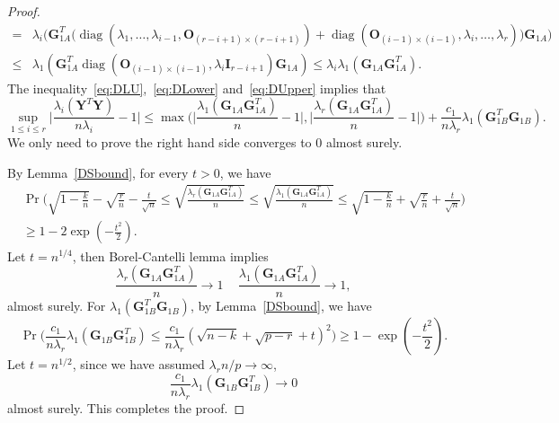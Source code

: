 \documentclass[12pt]{article} %
\DeclareMathOperator{\mydiag}{diag}
\newcommand{\bY}{\mathbf{Y}}
\newcommand{\bG}{\mathbf{G}}
\newcommand{\bO}{\mathbf{O}}
\newcommand{\bI}{\mathbf{I}}
\theoremstyle{definition}
\begin{document}
\begin{proof}
\begin{equation}
\begin{aligned}
=&\lambda_i\Big(
\bG_{1A}^T \big(
\mydiag(\lambda_1,\ldots,\lambda_{i-1},\bO_{(r-i+1)\times(r-i+1)})+
\mydiag(\bO_{(i-1)\times(i-1)},\lambda_i,\ldots,\lambda_r)
\big)
\bG_{1A}
\Big)\\
    \leq&
\lambda_1(\bG_{1A}^T \mydiag(\bO_{(i-1)\times(i-1)},\lambda_i \bI_{r-i+1}) \bG_{1A})
\leq  \lambda_i \lambda_1(\bG_{1A}\bG_{1A}^T).
\end{aligned}
\end{equation}
    The inequality~\eqref{eq:DLU},~\eqref{eq:DLower} and~\eqref{eq:DUpper} implies that
    $$
   \sup_{1\leq i \leq r} \Big|\frac{\lambda_i(\bY^T \bY)}{n\lambda_i}-1\Big|\leq
    \max\Big(\Big|\frac{\lambda_1(\bG_{1A}\bG_{1A}^T)}{n}-1\Big|,\Big|\frac{\lambda_r(\bG_{1A}\bG_{1A}^T)}{n}-1\Big|\Big)+\frac{c_1}{n\lambda_r}\lambda_1(\bG_{1B}^T \bG_{1B}).
    $$
    We only need to prove the right hand side converges to $0$ almost surely.

    By Lemma~\ref{DSbound}, for every $t>0$, we have
    $$
    \begin{aligned}
        &\Pr\Big(\sqrt{1-\frac{k}{n}}-\sqrt{\frac{r}{n}}-\frac{t}{\sqrt{n}}\leq \sqrt{\frac{\lambda_r(\bG_{1A}\bG_{1A}^T)}{n}}\leq \sqrt{\frac{\lambda_1(\bG_{1A}\bG_{1A}^T)}{n}}\leq \sqrt{1-\frac{k}{n}}+\sqrt{\frac{r}{n}}+\frac{t}{\sqrt{n}} \Big) \\
        &\geq 1-2\exp(-\frac{t^2}{2}).
    \end{aligned}
    $$
    Let $t=n^{1/4}$, then Borel-Cantelli lemma implies 
    $$
    \frac{\lambda_r(\bG_{1A}\bG_{1A}^T)}{n}\to 1\,\quad
    \frac{\lambda_1(\bG_{1A}\bG_{1A}^T)}{n}\to 1,
    $$
    almost surely.
    For $\lambda_1(\bG_{1B}^T \bG_{1B})$, by Lemma~\ref{DSbound}, we have
    $$
   \Pr\Big( \frac{c_1}{n\lambda_r}{\lambda_1(\bG_{1B}\bG_{1B}^T)}\leq \frac{c_1}{n\lambda_r}(\sqrt{n-k}+\sqrt{p-r}+t)^2 \Big) 
   \geq 1-\exp(-\frac{t^2}{2}).
    $$
Let $t=n^{1/2}$, since we have assumed $\lambda_r n/p\to \infty$, $$\frac{c_1}{n\lambda_r}{\lambda_1(\bG_{1B}\bG_{1B}^T)}\to 0$$
almost surely.
This completes the proof.
\end{proof}
\end{document}
